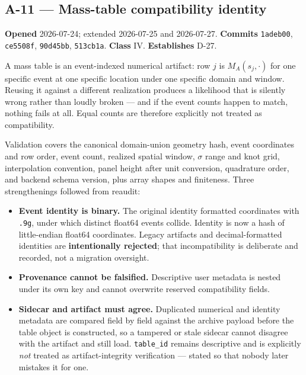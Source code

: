 \documentclass[
  10pt,
]{article}
\providecommand{\tightlist}{%
  \setlength{\itemsep}{0pt}\setlength{\parskip}{0pt}}
\begin{document}
\hypertarget{a-11}{%
\subsection{A-11 --- Mass-table compatibility identity}\label{a-11}}

\textbf{Opened} 2026-07-24; extended 2026-07-25 and 2026-07-27. \textbf{Commits} \texttt{1adeb00}, \texttt{ce5508f}, \texttt{90d45bb}, \texttt{513cb1a}. \textbf{Class} IV. \textbf{Establishes} D-27.

A mass table is an event-indexed numerical artifact: row \(j\) is \(M_A(s_j, \cdot)\) for one specific event at one specific location under one specific domain and window. Reusing it against a different realization produces a likelihood that is silently wrong rather than loudly broken --- and if the event counts happen to match, nothing fails at all. Equal counts are therefore explicitly not treated as compatibility.

Validation covers the canonical domain-union geometry hash, event coordinates and row order, event count, realized spatial window, \(\sigma\) range and knot grid, interpolation convention, panel height after unit conversion, quadrature order, and backend schema version, plus array shapes and finiteness. Three strengthenings followed from reaudit:

\begin{itemize}
\tightlist
\item
  \textbf{Event identity is binary.} The original identity formatted coordinates with \texttt{.9g}, under which distinct float64 events collide. Identity is now a hash of little-endian float64 coordinates. Legacy artifacts and decimal-formatted identities are \textbf{intentionally rejected}; that incompatibility is deliberate and recorded, not a migration oversight.
\item
  \textbf{Provenance cannot be falsified.} Descriptive user metadata is nested under its own key and cannot overwrite reserved compatibility fields.
\item
  \textbf{Sidecar and artifact must agree.} Duplicated numerical and identity metadata are compared field by field against the archive payload before the table object is constructed, so a tampered or stale sidecar cannot disagree with the artifact and still load. \texttt{table\_id} remains descriptive and is explicitly \emph{not} treated as artifact-integrity verification --- stated so that nobody later mistakes it for one.
\end{itemize}
\end{document}
